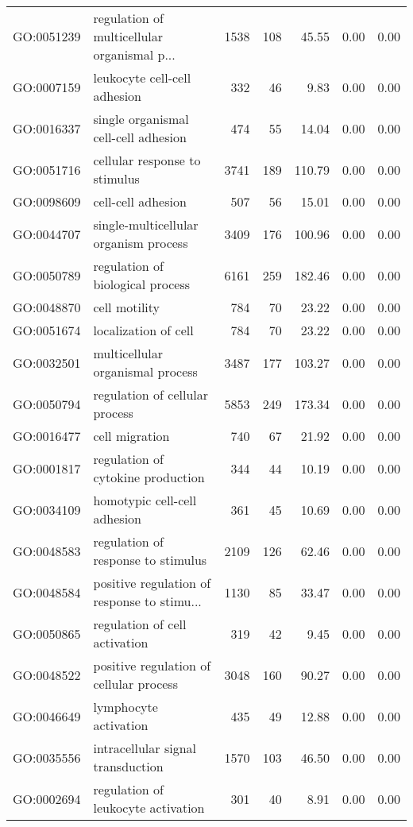 \begin{table}[ht]
\begin{tabular}{llrrrrr}
  GO:0051239 & regulation of multicellular organismal p... & 1538 & 108 & 45.55 & 0.00 & 0.00 \\ 
  GO:0007159 & leukocyte cell-cell adhesion & 332 &  46 & 9.83 & 0.00 & 0.00 \\ 
  GO:0016337 & single organismal cell-cell adhesion & 474 &  55 & 14.04 & 0.00 & 0.00 \\ 
  GO:0051716 & cellular response to stimulus & 3741 & 189 & 110.79 & 0.00 & 0.00 \\ 
  GO:0098609 & cell-cell adhesion & 507 &  56 & 15.01 & 0.00 & 0.00 \\ 
  GO:0044707 & single-multicellular organism process & 3409 & 176 & 100.96 & 0.00 & 0.00 \\ 
  GO:0050789 & regulation of biological process & 6161 & 259 & 182.46 & 0.00 & 0.00 \\ 
  GO:0048870 & cell motility & 784 &  70 & 23.22 & 0.00 & 0.00 \\ 
  GO:0051674 & localization of cell & 784 &  70 & 23.22 & 0.00 & 0.00 \\ 
  GO:0032501 & multicellular organismal process & 3487 & 177 & 103.27 & 0.00 & 0.00 \\ 
  GO:0050794 & regulation of cellular process & 5853 & 249 & 173.34 & 0.00 & 0.00 \\ 
  GO:0016477 & cell migration & 740 &  67 & 21.92 & 0.00 & 0.00 \\ 
  GO:0001817 & regulation of cytokine production & 344 &  44 & 10.19 & 0.00 & 0.00 \\ 
  GO:0034109 & homotypic cell-cell adhesion & 361 &  45 & 10.69 & 0.00 & 0.00 \\ 
  GO:0048583 & regulation of response to stimulus & 2109 & 126 & 62.46 & 0.00 & 0.00 \\ 
  GO:0048584 & positive regulation of response to stimu... & 1130 &  85 & 33.47 & 0.00 & 0.00 \\ 
  GO:0050865 & regulation of cell activation & 319 &  42 & 9.45 & 0.00 & 0.00 \\ 
  GO:0048522 & positive regulation of cellular process & 3048 & 160 & 90.27 & 0.00 & 0.00 \\ 
  GO:0046649 & lymphocyte activation & 435 &  49 & 12.88 & 0.00 & 0.00 \\ 
  GO:0035556 & intracellular signal transduction & 1570 & 103 & 46.50 & 0.00 & 0.00 \\ 
  GO:0002694 & regulation of leukocyte activation & 301 &  40 & 8.91 & 0.00 & 0.00 \\ 

\end{tabular}
\end{table}
